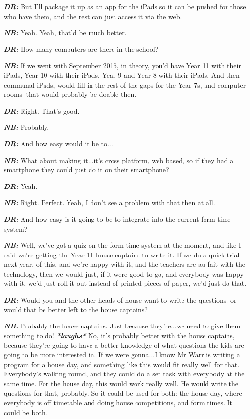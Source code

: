 \textit{\textbf{DR:}} But I'll package it up as an app for the iPads so it can be pushed for those who have them, and the rest can just access it via the web.

\textit{\textbf{NB:}} Yeah. Yeah, that'd be much better. 

\textit{\textbf{DR:}} How many computers are there in the school?

\textit{\textbf{NB:}} If we went with September 2016, in theory, you'd have Year 11 with their iPads, Year 10 with their iPads, Year 9 and Year 8 with their iPads. And then communal iPads, would fill in the rest of the gaps for the Year 7s, and computer rooms, that would probably be doable then.

\textit{\textbf{DR:}} Right. That's good.

\textit{\textbf{NB:}} Probably.

\textit{\textbf{DR:}} And how easy would it be to...

\textit{\textbf{NB:}} What about making it...it's cross platform, web based, so if they had a smartphone they could just do it on their smartphone?

\textit{\textbf{DR:}} Yeah.

\textit{\textbf{NB:}} Right. Perfect. Yeah, I don't see a problem with that then at all.

\textit{\textbf{DR:}} And how easy is it going to be to integrate into the current form time system?

\textit{\textbf{NB:}} Well, we've got a quiz on the form time system at the moment, and like I said we're getting the Year 11 house captains to write it. If we do a quick trial next year, of this, and we're happy with it, and the teachers are au fait with the technology, then we would just, if it were good to go, and everybody was happy with it, we'd just roll it out instead of printed pieces of paper, we'd just do that.

\textit{\textbf{DR:}} Would you and the other heads of house want to write the questions, or would that be better left to the house captains?

\textit{\textbf{NB:}} Probably the house captains. Just because they're...we need to give them something to do! \textit{\textbf{*laughs*}} No, it's probably better with the house captains, because they're going to have a better knowledge of what questions the kids are going to be more interested in. If we were gonna...I know Mr Warr is writing a program for a house day, and something like this would fit really well for that. Everybody's walking round, and they could do a set task with everybody at the same time. For the house day, this would work really well. He would write the questions for that, probably. So it could be used for both: the house day, where everybody is off timetable and doing house competitions, and form times. It could be both.

